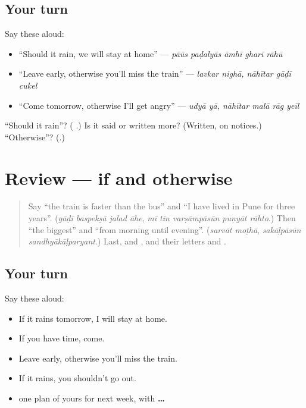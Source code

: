 \subsection*{Your turn}
Say these aloud:

\begin{itemize}
\raggedright
  \item \textquotedblleft{}Should it rain, we will stay at home\textquotedblright{} — \emph{pāūs paḍalyās āmhī gharī rāhū}
  \item \textquotedblleft{}Leave early, otherwise you'll miss the train\textquotedblright{} — \emph{lavkar nighā, nāhītar gāḍī cukel}
  \item \textquotedblleft{}Come tomorrow, otherwise I'll get angry\textquotedblright{} — \emph{udyā yā, nāhītar malā rāg yeīl}
\end{itemize}

\begin{tcolorbox}[breakable,colback=teal!4,colframe=teal!35!black,title={Before you move on}]
\textquotedblleft{}Should it rain\textquotedblright{}? (\textbf{ }.) Is it said or written more? (Written, on notices.) \textquotedblleft{}Otherwise\textquotedblright{}? (\textbf{}.)
\end{tcolorbox}
\section[(review)]{Review — if and otherwise}

\label{lesson:MR-R286-if-and-otherwise}



\begin{quote}
Say \textquotedblleft{}the train is faster than the bus\textquotedblright{} and \textquotedblleft{}I have lived in Pune for three years\textquotedblright{}. (\emph{gāḍī baspekṣā jalad āhe}, \emph{mī tīn varṣāmpāsūn puṇyāt rāhto}.) Then \textquotedblleft{}the biggest\textquotedblright{} and \textquotedblleft{}from morning until evening\textquotedblright{}. (\emph{sarvāt moṭhā}, \emph{sakāḷpāsūn sandhyākāḷparyant}.) Last, \textbf{} and \textbf{}, and their letters \textbf{} and \textbf{}.
\end{quote}

\subsection*{Your turn}
Say these aloud:

\begin{itemize}
\raggedright
  \item If it rains tomorrow, I will stay at home.
  \item If you have time, come.
  \item Leave early, otherwise you'll miss the train.
  \item If it rains, you shouldn't go out.
  \item one plan of yours for next week, with \textbf{ … }
\end{itemize}

